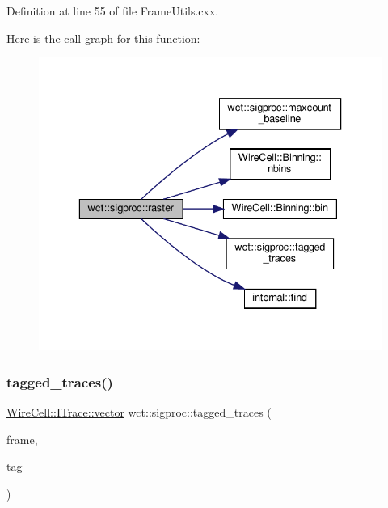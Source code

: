 Definition at line 55 of file Frame\+Utils.\+cxx.

Here is the call graph for this function\+:
\nopagebreak
\begin{figure}[H]
\begin{center}
\leavevmode
\includegraphics[width=336pt]{namespacewct_1_1sigproc_ad081c59d5eae16e2375425a9e1a65679_cgraph}
\end{center}
\end{figure}
\mbox{\label{namespacewct_1_1sigproc_a7be8644ccb0052eb5c68551b924b9b6f}} 
\subsubsection{\texorpdfstring{tagged\+\_\+traces()}{tagged\_traces()}}
{\footnotesize\ttfamily \hyperlink{class_wire_cell_1_1_i_data_ae1a9f863380499bb43f39fabb6276660}{Wire\+Cell\+::\+I\+Trace\+::vector} wct\+::sigproc\+::tagged\+\_\+traces (\begin{DoxyParamCaption}\item[{\hyperlink{class_wire_cell_1_1_i_data_aff870b3ae8333cf9265941eef62498bc}{Wire\+Cell\+::\+I\+Frame\+::pointer}}]{frame,  }\item[{\hyperlink{class_wire_cell_1_1_i_frame_ae206ba618e10f398625dfeb675a4215a}{Wire\+Cell\+::\+I\+Frame\+::tag\+\_\+t}}]{tag }\end{DoxyParamCaption})}

